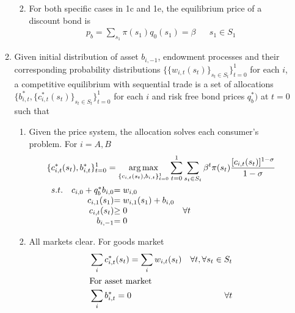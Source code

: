 \documentclass{article}
\DeclareMathOperator*{\argmax}{arg\,max}
\begin{document}
\begin{enumerate}
\begin{enumerate}
\begin{enumerate}
\begin{enumerate}
                \end{enumerate}
                \item For both specific cases in 1c and 1e, the equilibrium price of a discount bond is 
                \begin{align*}
                    p_b=\sum_{s_1}\pi(s_1)q_0(s_1)=\beta&&s_1\in S_1
                \end{align*}
            \end{enumerate}
            \item Given initial distribution of asset \(b_{i,-1}\), endowment processes and their corresponding probability distributions \(\{\{w_{i,t}(s_t)\}_{s_t\in S_t}\}_{t=0}^1\) for each \(i\),
            a competitive equilibrium with sequential trade is a set of allocations \(\{b_{i,t}^\ast,\{c_{i,t}^\ast(s_t)\}_{s_t\in S_t}\}_{t=0}^1\) 
            for each \(i\) and  risk free bond prices \(q_{b}^\ast)\) at \(t=0\) such that
                \begin{enumerate}
                    \item Given the price system, the allocation solves each consumer's problem. For \(i=A,B\)
                    \begin{align*}
                        &\{c_{i,t}^\ast(s_t),b_{i,t}^\ast\}_{t=0}^1=\argmax_{\{c_{i,t}(s_t),b_{i,t}\}_{t=0}^1}\sum_{t=0}^1\sum_{s_t\in S_t}\beta^t\pi(s_t)\frac{[c_{i,t}(s_t)]^{1-\sigma}}{1-\sigma}\\
                        &\begin{array}{r@{\quad}r@{}l@{\quad}l}
                        s.t.&c_{i,0}+q_{b}^\ast b_{i,0}&= w_{i,0}\\
                        &c_{i,1}(s_1)&=w_{i,1}(s_1)+b_{i,0}\\
                        &c_{i,t}(s_t)&\ge0 &\forall t\\
                        &b_{i,-1}&=0
                        \end{array} 
                    \end{align*}
                    \item All markets clear. For goods market 
                    \begin{align*}
                        &\sum_i c_{i,t}^\ast(s_t)=\sum_i w_{i,t}(s_t)&\forall t,\forall s_t\in S_t\\
                        \intertext{For asset market}
                        &\sum_i b_{i,t}^\ast=0&\forall t
                    \end{align*}

\end{enumerate}
\end{enumerate}
\end{enumerate}
\end{document}
